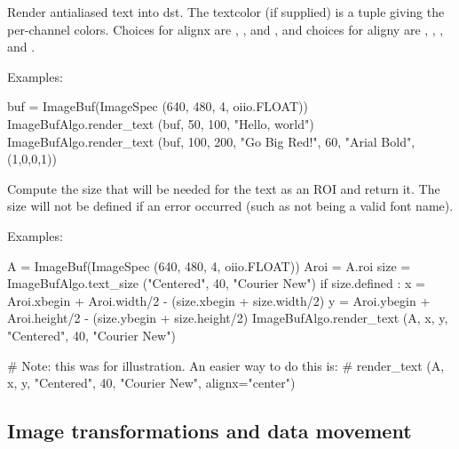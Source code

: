 Render antialiased text into {\cf dst}.  The {\cf textcolor} (if supplied)
is a tuple giving the per-channel colors. Choices for {\cf alignx} are
, , and , and choices for {\cf aligny} are
, , , and .

\smallskip
\noindent Examples:
\begin{code}
    buf = ImageBuf(ImageSpec (640, 480, 4, oiio.FLOAT))
    ImageBufAlgo.render_text (buf, 50, 100, "Hello, world")
    ImageBufAlgo.render_text (buf, 100, 200, "Go Big Red!",
                              60, "Arial Bold", (1,0,0,1))
\end{code}
\apiend


 

\NEW %
Compute the size that will be needed for the text as an ROI and return it.
The size will not be {\cf defined} if an error occurred (such as not being a
valid font name).

\smallskip
\noindent Examples:
\begin{code}
    A = ImageBuf(ImageSpec (640, 480, 4, oiio.FLOAT))
    Aroi = A.roi
    size = ImageBufAlgo.text_size ("Centered", 40, "Courier New")
    if size.defined :
        x = Aroi.xbegin + Aroi.width/2  - (size.xbegin + size.width/2)
        y = Aroi.ybegin + Aroi.height/2 - (size.ybegin + size.height/2)
        ImageBufAlgo.render_text (A, x, y, "Centered", 40, "Courier New")

    # Note: this was for illustration. An easier way to do this is:
    #   render_text (A, x, y, "Centered", 40, "Courier New", alignx="center")
\end{code}
\apiend



\subsection{Image transformations and data movement}
\label{sec:iba:py:transforms}

 

